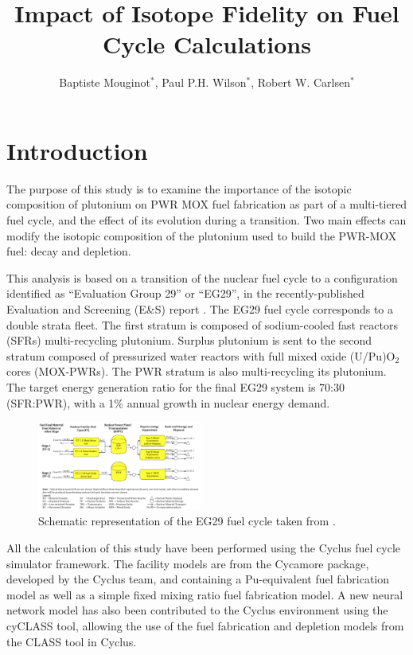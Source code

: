 \documentclass{anstrans}
\title{Impact of Isotope Fidelity on Fuel Cycle Calculations}
\author{ Baptiste Mouginot$^{*}$, Paul P.H. Wilson$^{*}$, Robert W. Carlsen$^{*}$ }
\institute{
$^{*}$University of Wisconsin-Madison, WI
}
\begin{document}
\section{Introduction} 

The purpose of this study is to examine the importance of the isotopic
composition of plutonium on PWR MOX fuel fabrication as part of a multi-tiered
fuel cycle, and the effect of its evolution during a transition. Two main
effects can modify the isotopic composition of the plutonium used to build the
PWR-MOX fuel: decay and depletion.

This analysis is based on a transition of the nuclear fuel cycle
to a configuration identified as ``Evaluation Group 29'' or ``EG29'', in the
recently-published Evaluation and Screening (E\&S) report \cite{ES}.  The EG29 fuel
cycle corresponds to a double strata fleet. The first stratum is composed of
sodium-cooled fast reactors (SFRs) multi-recycling plutonium. Surplus
plutonium is sent to the second stratum composed of pressurized water
reactors with full mixed oxide (U/Pu)O$_{2}$ cores (MOX-PWRs).  The PWR stratum
is also multi-recycling its plutonium. The target energy generation ratio for
the final EG29 system is 70:30 (SFR:PWR), with a 1\% annual growth in nuclear
energy demand.

\begin{figure}[ht] %
  \centering
  \includegraphics[width=0.48\textwidth]{FCDP_cycle}
  \caption{Schematic representation of the EG29 fuel cycle taken from \cite{FCDP}.}
  \label{fig:FCDP}
\end{figure}

All the calculation of this study have been performed using the Cyclus fuel cycle
simulator framework\cite{CYCLUS}. The facility models are from the Cycamore package, developed by the
Cyclus team, and containing a Pu-equivalent fuel fabrication model as well as
a simple fixed mixing ratio fuel fabrication model. A new neural network model has
also been contributed to the Cyclus environment using the cyCLASS tool\cite{cyCLASS}, 
allowing the use of the fuel fabrication and depletion models from the CLASS tool
\cite{CLASS} in Cyclus.
\end{document}
